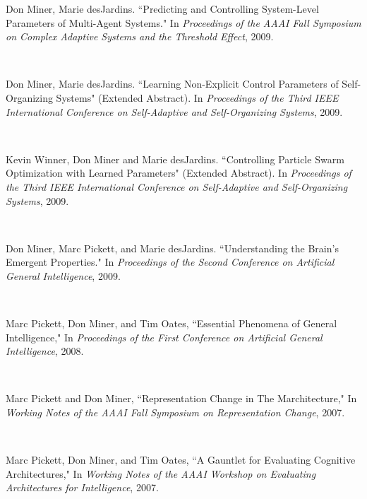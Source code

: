 \begin{titlepage}
\begin{flushleft}
\begin{singlespace}
  {\hspace{0.4in}} \parbox[t]{5.5in}{ Don Miner, Marie desJardins. ``Predicting and Controlling System-Level Parameters of Multi-Agent Systems." In {\em Proceedings of the AAAI Fall Symposium on Complex Adaptive Systems and the Threshold Effect}, 2009.}\\
  {\vspace{5pt}}
  {\hspace{0.4in}} \parbox[t]{5.5in}{ Don Miner, Marie desJardins. ``Learning Non-Explicit Control Parameters of Self-Organizing Systems" (Extended Abstract). In {\em Proceedings of  the Third IEEE International Conference on Self-Adaptive and Self-Organizing Systems}, 2009.}\\
  {\vspace{5pt}}
  {\hspace{0.4in}} \parbox[t]{5.5in}{ Kevin Winner, Don Miner and Marie desJardins. ``Controlling Particle Swarm Optimization with Learned Parameters" (Extended Abstract). In {\em Proceedings of the Third IEEE International Conference on Self-Adaptive and Self-Organizing Systems}, 2009.}\\
  {\vspace{5pt}}
  {\hspace{0.4in}} \parbox[t]{5.5in}{ Don Miner, Marc Pickett, and Marie desJardins. ``Understanding the Brain's Emergent Properties." In {\em Proceedings of the Second Conference on Artificial General Intelligence}, 2009.}\\
  {\vspace{5pt}}
  {\hspace{0.4in}} \parbox[t]{5.5in}{ Marc Pickett, Don Miner, and Tim Oates, ``Essential Phenomena of General Intelligence," In {\em Proceedings of the First Conference on Artificial General Intelligence}, 2008.}\\
  {\vspace{5pt}}
  {\hspace{0.4in}} \parbox[t]{5.5in}{ Marc Pickett and Don Miner, ``Representation Change in The Marchitecture," In {\em Working Notes of the AAAI Fall Symposium on Representation Change}, 2007.}\\
  {\vspace{5pt}}
  {\hspace{0.4in}} \parbox[t]{5.5in}{ Marc Pickett, Don Miner, and Tim Oates, ``A Gauntlet for Evaluating Cognitive Architectures," In {\em Working Notes of the AAAI Workshop on Evaluating Architectures for Intelligence}, 2007. }\\

\end{singlespace}
\end{flushleft}
\end{titlepage}
